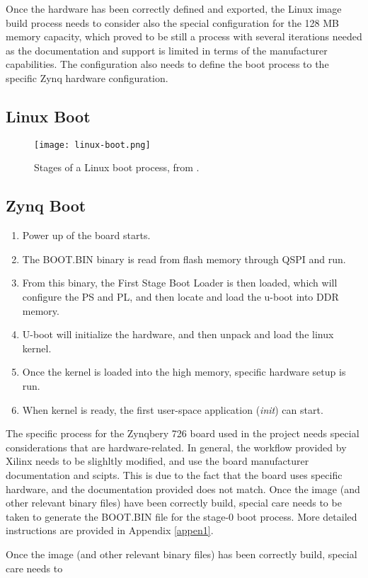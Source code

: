 Once the hardware has been correctly defined and exported, the Linux image build process needs to consider also the special configuration for the 128 MB memory capacity, which proved to be still a process with several iterations needed as the documentation and support is limited in terms of the manufacturer capabilities. The configuration also needs to define the boot process to the specific Zynq hardware configuration.

\subsection{Linux Boot}

\begin{figure}[htp]
	\centering
	\texttt{[image: linux-boot.png]}
	\caption{Stages of a Linux boot process, from \cite{Crokett2014}.} \label{fig:linux-boot}
\end{figure}

\subsection{Zynq Boot}

\begin{enumerate}
	\item Power up of the board starts.
	\item The BOOT.BIN binary is read from flash memory through QSPI and run.
	\item From this binary, the First Stage Boot Loader is then loaded, which will configure the PS and PL, and then locate and load the u-boot into DDR memory.
	\item U-boot will initialize the hardware, and then unpack and load the linux kernel.
	\item Once the kernel is loaded into the high memory, specific hardware setup is run.
	\item When kernel is ready, the first user-space application (\textit{init}) can start.
\end{enumerate}

The specific process for the Zynqbery 726 board used in the project needs special considerations that are hardware-related. In general, the workflow provided by Xilinx needs to be slighltly modified, and use the board manufacturer documentation and scipts. This is due to the fact that the board uses specific hardware, and the documentation provided does not match. Once the image (and other relevant binary files) have been correctly build, special care needs to be taken to generate the BOOT.BIN file for the stage-0 boot process. More detailed instructions are provided in Appendix \ref{appen1}.

Once the image (and other relevant binary files) has been correctly build, special care needs to 

